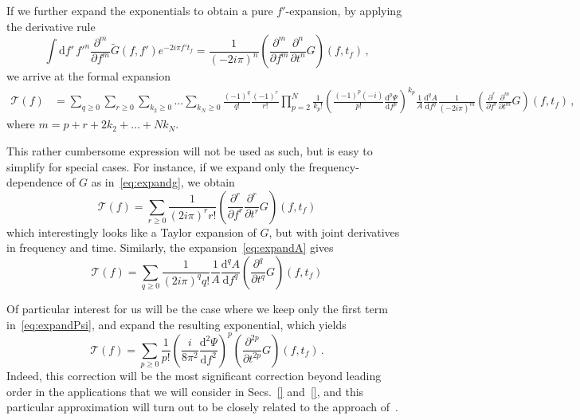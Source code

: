 \documentclass[aps,showpacs,%
prd,superscriptaddress,nofootinbib]{revtex4}
\newcommand{\be}{\begin{equation}}
\newcommand{\ee}{\end{equation}}
\newcommand\ud{{\mathrm{d}}}
\newcommand\calT{{\mathcal{T}}}
\newcommand{\tf}{t_{f}}
\begin{document}
If we further expand the exponentials to obtain a pure $f'$-expansion, by applying the derivative rule
\be
	\int \ud f'\, {f'}^{n} \frac{\partial^{m} }{\partial f^{m}}  \tilde{G}(f,f') e^{-2i\pi f' \tf} = \frac{1}{(-2i\pi)^{n}} \left( \frac{\partial^{m} }{\partial f^{m}} \frac{\partial^{n} }{\partial t^{n}} G \right)(f,\tf) \,,
\ee
we arrive at the formal expansion
\begin{align}
	\calT(f) &= \sum\limits_{q\geq 0} \sum\limits_{r\geq 0} \sum\limits_{k_{2}\geq 0} \dots \sum\limits_{k_{N}\geq 0} \frac{(-1)^{q}}{q!} \frac{(-1)^{r}}{r!} \prod\limits_{p=2}^{N} \frac{1}{k_{p}!}\left( \frac{(-1)^{p}(-i)}{p!} \frac{\ud^{p}\Psi}{\ud f^{p}}\right)^{k_{p}} \frac{1}{A} \frac{\ud^{q} A}{\ud f ^{q}} \frac{1}{(-2i\pi)^m} \left( \frac{\partial^{r} }{\partial f^{r}} \frac{\partial^{m} }{\partial t^{m}} G \right)(f,\tf) \,,
\end{align}
where $m = p+r+2k_{2}+\dots+N k_{N}$.

This rather cumbersome expression will not be used as such, but is easy to simplify for special cases. For instance, if we expand only the frequency-dependence of $G$ as in~\eqref{eq:expandg}, we obtain
\be\label{eq:taylordelay}
	\calT(f) = \sum\limits_{r\geq 0} \frac{1}{(2i\pi)^{r}r!} \left( \frac{\partial^{r} }{\partial f^{r}} \frac{\partial^{r} }{\partial t^{r}} G \right)(f,\tf)
\ee
which interestingly looks like a Taylor expansion of $G$, but with joint derivatives in frequency and time. Similarly, the expansion~\eqref{eq:expandA} gives
\be\label{eq:resultdfA}
	\calT(f) = \sum\limits_{q\geq 0} \frac{1}{(2i\pi)^{q}q!} \frac{1}{A} \frac{\ud^{q} A}{\ud f ^{q}}  \left( \frac{\partial^{q} }{\partial t^{q}} G \right)(f,\tf)
\ee

Of particular interest for us will be the case where we keep only the first term in~\eqref{eq:expandPsi}, and expand the resulting exponential, which yields
\be\label{eq:resultdffPsi}
	\calT(f) = \sum\limits_{p\geq 0} \frac{1}{p!} \left( \frac{i}{8\pi^{2}}\frac{\ud^{2} \Psi}{\ud f^{2}} \right)^{p} \left( \frac{\partial^{2p} }{\partial t^{2p}} G \right)(f, \tf) \,.
\ee
Indeed, this correction will be the most significant correction beyond leading order in the applications that we will consider in Secs.~\ref{} and~\ref{}, and this particular approximation will turn out to be closely related to the approach of~\cite{KCY14}.
\end{document}

